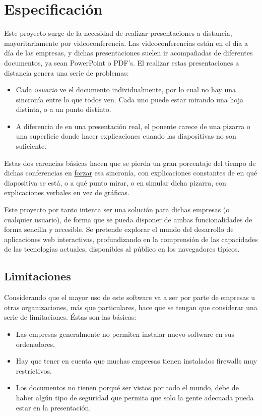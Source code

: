 \section{Especificaci\'on} %
\label{sec:especificacion}

Este proyecto surge de la necesidad de realizar presentaciones a distancia, mayoritariamente por videoconferencia. Las videoconferencias están en el día a día de las empresas, y dichas presentaciones suelen ir acompañadas de diferentes documentos, ya sean PowerPoint o PDF's. El realizar estas presentaciones a distancia genera una serie de problemas:

\begin{itemize}
	\item Cada \emph{usuario} ve el documento individualmente, por lo cual no hay una sincronía entre lo que todos ven. Cada uno puede estar mirando una hoja distinta, o a un punto distinto.
	\item A diferencia de en una presentación real, el ponente carece de una pizarra o una superficie donde hacer explicaciones cuando las diapositivas no son suficiente.
\end{itemize}

Estas dos carencias básicas hacen que se pierda un gran porcentaje del tiempo de dichas conferencias en \underline{forzar} esa sincronía, con explicaciones constantes de en qué diapositiva se está, o a qué punto mirar, o en simular dicha pizarra, con explicaciones verbales en vez de gráficas.

Este proyecto por tanto intenta ser una solución para dichas empresas (o cualquier usuario), de forma que se pueda disponer de ambas funcionalidades de forma sencilla y accesible. Se pretende explorar el mundo del desarrollo de aplicaciones web interactivas, profundizando en la comprensión de las capacidades de las tecnologías actuales, disponibles al público en los navegadores típicos.

\subsection{Limitaciones}
Considerando que el mayor uso de este software va a ser por parte de empresas u otras organizaciones, más que particulares, hace que se tengan que considerar una serie de limitaciones. Éstas son las básicas:

\begin{itemize}
	\item Las empresas generalmente no permiten instalar nuevo software en sus ordenadores.
	\item Hay que tener en cuenta que muchas empresas tienen instalados firewalls muy restrictivos.
	\item Los documentos no tienen porqué ser vistos por todo el mundo, debe de haber algún tipo de seguridad que permita que solo la gente adecuada pueda estar en la presentación.
\end{itemize}


